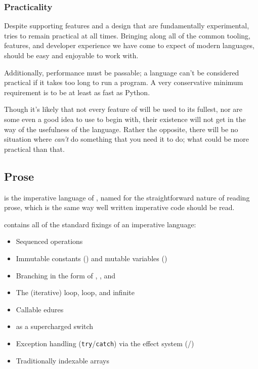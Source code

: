 \subsubsection{Practicality}

Despite supporting features and a design that are fundamentally experimental,
\Trilogy{} tries to remain practical at all times. Bringing along all of the
common tooling, features, and developer experience we have come to expect of
modern languages, \Trilogy{} should be easy and enjoyable to work with.

Additionally, performance must be passable; a language can't be considered
practical if it takes too long to run a program. A very conservative minimum
requirement is to be at least as fast as Python.

Though it's likely that not every feature of \Trilogy{} will be used to its
fullest, nor are some even a good idea to use to begin with, their existence
will not get in the way of the usefulness of the language. Rather the opposite,
there will be no situation where \Trilogy{} \emph{can't} do something that you
need it to do; what could be more practical than that.

\subsection{Prose}

\Prose{} is the imperative language of \Trilogy{}, named for the
straightforward nature of reading prose, which is the same way
well written imperative code should be read.

\Prose{} contains all of the standard fixings of an imperative language:
\begin{itemize}
    \item Sequenced operations
    \item Immutable constants () and mutable variables ()
    \item Branching in the form of , , and 
    \item The (iterative)  loop,  loop, and infinite 
    \item Callable edures
    \item {} as a supercharged switch
    \item Exception handling (\texttt{try}/\texttt{catch}) via the effect system (/)
    \item Traditionally indexable arrays
\end{itemize}

